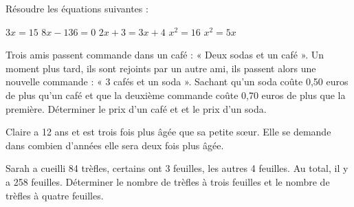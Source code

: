 \begin{center}
Résoudre les équations suivantes :
\end{center}

$3x = 15$ \hfill $8x - 136 = 0$  \hfill $2x + 3 = 3x + 4$
  \hfill $x^2 = 16$   \hfill $x^2 = 5x$  %



Trois amis passent commande dans un café : « Deux sodas et un café ».
Un moment plus tard, ils sont rejoints par un autre ami,
ils passent alors une nouvelle commande : « 3 cafés et un soda ».
Sachant qu’un soda coûte 0,50 euros de plus qu’un café et que la deuxième commande coûte 0,70 euros de plus que la première.
Déterminer le prix d’un café et et le prix d’un soda.

Claire a 12 ans et est trois fois plus âgée que sa petite sœur.
Elle se demande dans combien d’années elle sera deux fois plus âgée.

Sarah a cueilli 84 trèfles, certains ont 3 feuilles, les autres 4 feuilles.
Au total, il y a 258 feuilles.
Déterminer le nombre de trèfles à trois feuilles et le nombre de trèfles à quatre feuilles.
